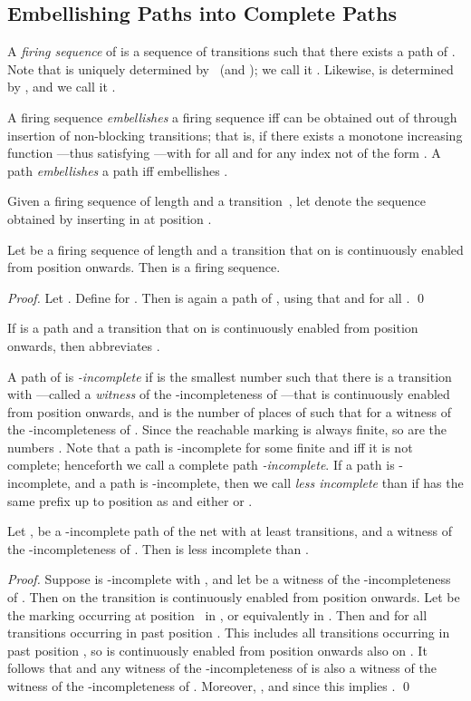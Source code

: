 \documentclass[smallcondensed]{svjour3}
\begin{document}
\subsection{Embellishing Paths into Complete Paths}

\newcommand{\fs}{\mbox{\sc fs}}
\newcommand{\ph}{\mbox{\sc ph}}
A \emph{firing sequence} of  is a sequence  of transitions such that
there exists a path  of . Note that  is uniquely
determined by~ (and ); we call it . Likewise,  is determined by , and
we call it .

A firing sequence  \emph{embellishes} a firing sequence 
iff  can be obtained out of  through insertion of non-blocking transitions;
that is, if there exists a monotone increasing function ---thus satisfying ---with  for all  and  for any
index  not of the form . A path  \emph{embellishes} a path  iff 
embellishes .

Given a firing sequence  of length  and a transition~, let
 denote the sequence  obtained by
inserting  in  at position .

\begin{lemma}\label{lem:one step embellishment}
Let  be a firing sequence of length  and  a transition that on  is continuously
enabled from position  onwards. Then  is a firing sequence.
\end{lemma}
\begin{proof}
Let . Define
 for . Then
 is again a path of ,
using that  and  for all .
\qed
\end{proof}
If  is a path and  a transition that on  is continuously enabled from position 
onwards, then  abbreviates .

A path  of  is \emph{-incomplete} if  is the
smallest number such that there is a transition  with ---called a \emph{witness} of the
-incompleteness of ---that is continuously enabled from position  onwards, and  is
the number of places  of  such that
 for a witness  of the -incompleteness of .
Since the reachable marking  is always finite, so are the numbers .
Note that a path is -incomplete for some finite  and  iff it is not complete;
henceforth we call a complete path \emph{-incomplete}.
If a path  is -incomplete, and a path  is -incomplete, then we call
 \emph{less incomplete} than  if  has the same prefix up to position 
as  and either  or .

\begin{lemma}\label{lem:less incomplete}
Let ,  be a -incomplete path of the net  with at least 
transitions, and  a witness of the -incompleteness of . Then  is less incomplete than .
\end{lemma}
\begin{proof}
Suppose  is -incomplete with , and let  be a witness of the
-incompleteness of .
Then on  the transition  is continuously enabled from position  onwards.
Let  be the marking occurring at position~ in , or equivalently in .
Then  and \mbox{} for all transitions
 occurring in  past position . This includes all transitions  occurring
in  past position , so  is continuously enabled from position  onwards also on .
It follows that  and any witness of the -incompleteness of  is also a
witness of the witness of the -incompleteness of .
Moreover, , and since
 this implies .
\qed
\end{proof}
\end{document}
